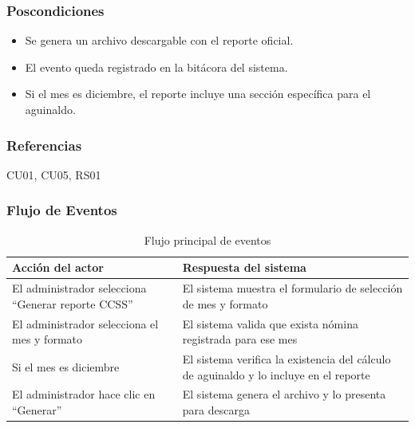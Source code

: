\subsubsection*{Poscondiciones}
\begin{itemize}
	\item Se genera un archivo descargable con el reporte oficial.
	\item El evento queda registrado en la bitácora del sistema.
	\item Si el mes es diciembre, el reporte incluye una sección específica para el aguinaldo.
\end{itemize}

\subsubsection*{Referencias}
CU01, CU05, RS01

\subsubsection*{Flujo de Eventos}
\begin{table}[h]
	\centering
	\caption{Flujo principal de eventos}
	\begin{tabular}{|p{7cm}|p{7cm}|}
		\hline
		\textbf{Acción del actor}                          & \textbf{Respuesta del sistema}                                 \\ \hline
		El administrador selecciona “Generar reporte CCSS” & El sistema muestra el formulario de selección de mes y formato \\ \hline
		El administrador selecciona el mes y formato       & El sistema valida que exista nómina registrada para ese mes    \\ \hline
		Si el mes es diciembre                             & El sistema verifica la existencia del cálculo de aguinaldo y lo incluye en el reporte \\ \hline
		El administrador hace clic en “Generar”            & El sistema genera el archivo y lo presenta para descarga       \\ \hline
	\end{tabular}
\end{table}

